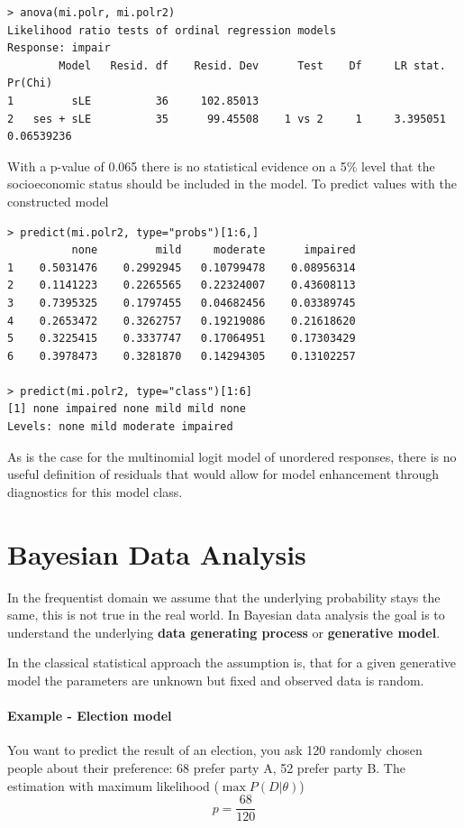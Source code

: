 \documentclass[11pt]{article}
\begin{document}
\begin{verbatim}
> anova(mi.polr, mi.polr2)
Likelihood ratio tests of ordinal regression models
Response: impair
        Model   Resid. df    Resid. Dev      Test    Df     LR stat.      Pr(Chi)
1         sLE          36     102.85013
2   ses + sLE          35      99.45508    1 vs 2     1     3.395051   0.06539236
\end{verbatim}

With a p-value of 0.065 there is no statistical evidence on a 5\% level that the socioeconomic status should be included in the model. To predict values with the constructed model

\begin{verbatim}
> predict(mi.polr2, type="probs")[1:6,]
          none         mild     moderate      impaired
1    0.5031476    0.2992945   0.10799478    0.08956314
2    0.1141223    0.2265565   0.22324007    0.43608113
3    0.7395325    0.1797455   0.04682456    0.03389745
4    0.2653472    0.3262757   0.19219086    0.21618620
5    0.3225415    0.3337747   0.17064951    0.17303429
6    0.3978473    0.3281870   0.14294305    0.13102257

> predict(mi.polr2, type="class")[1:6]
[1] none impaired none mild mild none
Levels: none mild moderate impaired
\end{verbatim}

As is the case for the multinomial logit model of unordered responses, there is no useful definition of residuals that would allow for model enhancement through diagnostics for this model class.

\section{Bayesian Data Analysis}

In the frequentist domain we assume that the underlying probability stays the same, this is not true in the real world. In Bayesian data analysis the goal is to understand the underlying \textbf{data generating process} or \textbf{generative model}. 

In the classical statistical approach the assumption is, that for a given generative model the parameters are unknown but fixed and observed data is random.

\paragraph{Example - Election model} You want to predict the result of an election, you ask 120 randomly chosen people about their preference: 68 prefer party A, 52 prefer party B. The estimation with maximum likelihood ($\max P(D|\theta)$)
\begin{equation*}
	p = \frac{68}{120}
\end{equation*}
\end{document}

